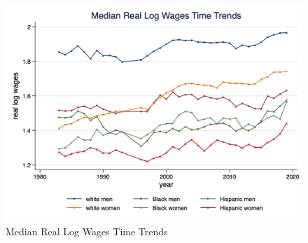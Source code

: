 \documentclass[11pt]{article}
\begin{document}
{\pagebreak
\begin{figure}[h!]
\centering
    \caption{Median Real Log Wages Time Trends}\label{fig:med_wage_time}
    \includegraphics[width=\textwidth, height = 0.8\textheight, keepaspectratio]{figures/fin_med_wage_time.png}
\end{figure}

}
\end{document}
